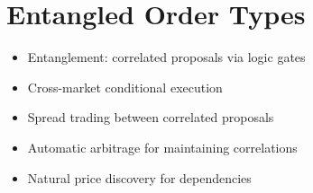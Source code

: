 \documentclass{article}
\begin{document}
\section{Entangled Order Types}
\begin{itemize}
    \item Entanglement: correlated proposals via logic gates
    \item Cross-market conditional execution
    \item Spread trading between correlated proposals
    \item Automatic arbitrage for maintaining correlations
    \item Natural price discovery for dependencies
\end{itemize}



\end{document}
